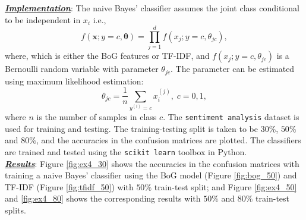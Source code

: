 \documentclass[12pt, a4 paper]{article}
\newcommand{\bx}{\mathbf{x}}
\newcommand{\btheta}{\boldsymbol{\theta}}
\begin{document}
\underline {\it \bfseries Implementation}: The naive Bayes' classifier assumes the joint class conditional to be independent in $x_{i}$ i.e.,
\begin{equation}
	f(\bx; y=c, \btheta) = \prod_{j=1}^{d} f(x_{j}; y=c, \theta_{jc}),
\label{eq:baiveBayes}
\end{equation}
where, which is either the BoG features or TF-IDF, and  $f(x_{j}; y=c, \theta_{jc})$ is a Bernoulli random variable with parameter $\theta_{jc}$. The parameter can be estimated using maximum likelihood estimation:
\begin{equation}
	\theta_{jc} = \frac{1}{n} \sum_{y^{(i)}=c} x_{i}^{(j)}, \; c=0,1,
\label{eq:bogMle}
\end{equation}
where $n$ is the number of samples in class $c$. The \texttt{sentiment analysis} dataset is used for training and testing. The training-testing split is taken to be $30\%$, $50\%$ and $80\%$, and the accuracies in the confusion matrices are plotted. The classifiers are trained and tested using the \texttt{scikit learn} toolbox in Python. \\

\underline {\it \bfseries Results}: Figure \ref{fig:ex4_30} shows the accuracies in the confusion matrices with training a naive Bayes' classifier using the BoG model (Figure \ref{fig:bog_50}) and TF-IDF (Figure \ref{fig:tfidf_50}) with $50\%$ train-test split; and Figure \ref{fig:ex4_50} and \ref{fig:ex4_80} shows the corresponding results with $50\%$ and $80\%$ train-test splits. \\
\end{document}

